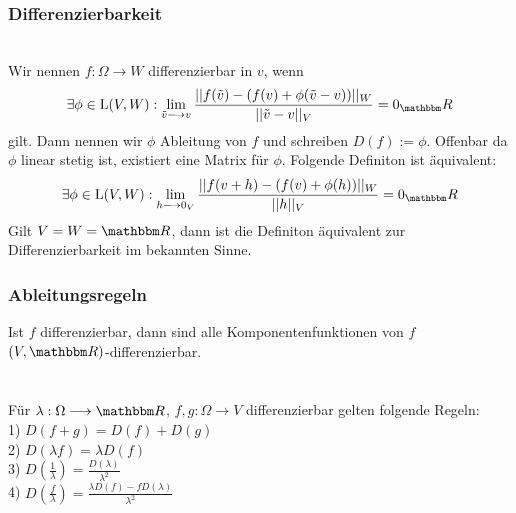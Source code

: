 \subsubsection*{Differenzierbarkeit}
 \\
Wir nennen \(f : \Omega \longrightarrow W\) differenzierbar in \(v\), wenn \[\exists \phi \in \text L(V,W): \lim_{\tilde v \longrightarrow v} \frac{||f(\tilde v) - (f(v) + \phi(\tilde v - v))||_W}{||\tilde v - v||_V} = 0_\R\]
gilt. Dann nennen wir \(\phi\) Ableitung von \(f\) und schreiben \(D(f) := \phi\). Offenbar da \(\phi\) linear stetig ist, existiert eine Matrix für \(\phi\). Folgende Definiton ist äquivalent: \[\exists \phi \in \text L(V,W): \lim_{h \longrightarrow 0_V} \frac{||f(v + h) - (f(v) + \phi(h))||_W}{||h||_V} = 0_\R\]
Gilt \(V = W = \R\), dann ist die Definiton äquivalent zur Differenzierbarkeit im bekannten Sinne.
\subsubsection*{Ableitungsregeln}
Ist \(f\) differenzierbar, dann sind alle Komponentenfunktionen von \(f\) \((V,\R)\)-differenzierbar. \\ \\
 \\
Für \(\lambda : \Omega \longrightarrow \R\), \(f,g : \Omega \longrightarrow V\) differenzierbar gelten folgende Regeln:\\
1) \(D(f+g) = D(f) + D(g)\) \\
2) \(D(\lambda f) = \lambda D(f)\) \\
3) \(D\left(\frac{1}{\lambda}\right) = \frac{D(\lambda)}{\lambda^2}\) \\
4) \(D\left(\frac{f}{\lambda}\right) = \frac{\lambda D(f) - fD(\lambda)}{\lambda^2}\)
